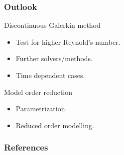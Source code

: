 \documentclass{beamer}
\begin{document}

\begin{frame}
\frametitle{Outlook}
\begin{block}{Discontinuous Galerkin method}
\begin{itemize}
\item Test for higher Reynold's number.
\item Further solvers/methods.
\item Time dependent cases.
\end{itemize}
\end{block}

\begin{block}{Model order reduction}
\begin{itemize}
\item Parametrization.
\item Reduced order modelling.
\end{itemize}
\end{block}


\end{frame}

\begin{frame}
\frametitle{References}




\end{frame}
\appendix
\end{document}
